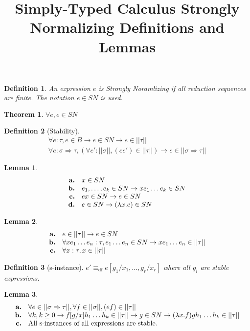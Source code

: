 \documentclass{article}
\title{Simply-Typed Calculus Strongly Normalizing Definitions and Lemmas}
\newtheorem{definition}{Definition}
\newtheorem{theorem}{Theorem}
\newtheorem{lemma}{Lemma}
\begin{document}
\begin{definition}
An expression $e$ is {\em Strongly Noramlizing} if all reduction sequences
are finite.  The notation $e\in SN$ is used.
\end{definition}
\begin{theorem}
$\forall e, e\in SN$
\end{theorem}
\begin{definition}[Stability]
$$
\begin{array}{l}
	\forall e : \tau, e\in B\to e\in SN\to e\in||\tau|| \\
	\forall e : \sigma\Rightarrow\tau, (\forall e' : ||\sigma||, (e e')\in ||\tau||)\to e\in||\sigma\Rightarrow\tau||
\end{array}
$$
\end{definition}
\begin{lemma}
$$
\begin{array}{rl}
	\mbox{\bf a.} &x\in SN\\
	\mbox{\bf b.} &e_1,\ldots,e_k\in SN\to xe_1\ldots e_k\in SN\\
	\mbox{\bf c.} &ex\in SN\to e\in SN\\
	\mbox{\bf d.} &e\in SN\to (\lambda x. e)\in SN
\end{array}
$$
\end{lemma}
\begin{lemma}
$$
\begin{array}{rl}
	\mbox{\bf a.} &e\in ||\tau||\to e\in SN \\
	\mbox{\bf b.} &\forall x e_1\ldots e_n : \tau, e_1\ldots e_n\in SN\to x e_1\ldots e_n\in ||\tau|| \\
	\mbox{\bf c.} &\forall x : \tau, x\in ||\tau||
\end{array}
$$
\end{lemma}
\begin{definition}[s-instance]
	$ e' \equiv_{\mbox{df}} e[g_1/x_1,\ldots , g_r/x_r] $ where all $g_i$ are stable expressions.
\end{definition}
\begin{lemma}
$$
\begin{array}{rl}
	\mbox{\bf a.} &\forall e\in ||\sigma\Rightarrow\tau||, \forall f\in ||\sigma||, (e f)\in ||\tau|| \\
	\mbox{\bf b.} &\forall k, k\geq 0\to f[g/x]h_1\ldots h_k\in ||\tau||\to g\in SN\to (\lambda x. f)g h_1\ldots h_k\in ||\tau|| \\
	\mbox{\bf c.} &\mbox{All s-instances of all expressions are stable.}
\end{array}
$$
\end{lemma}
\end{document}
